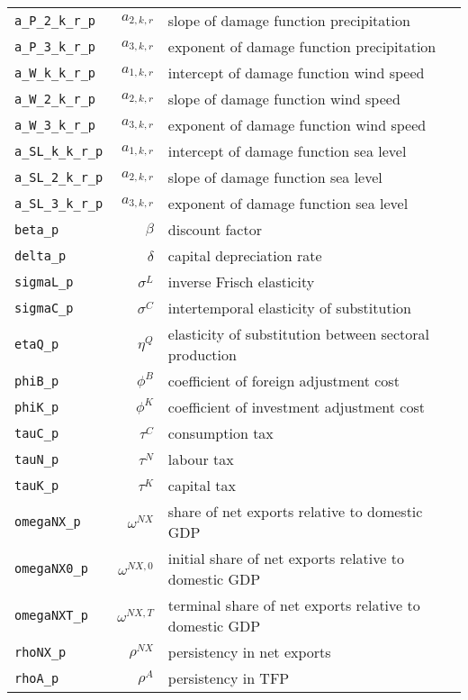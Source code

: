 \begin{center}
\begin{longtable}{lrl}
\texttt{a\_P\_2\_k\_r\_p} & ${a_{2,k,r}}$ & slope of damage function precipitation\\
\texttt{a\_P\_3\_k\_r\_p} & ${a_{3,k,r}}$ & exponent of damage function precipitation\\
\texttt{a\_W\_k\_k\_r\_p} & ${a_{1,k,r}}$ & intercept of damage function wind speed\\
\texttt{a\_W\_2\_k\_r\_p} & ${a_{2,k,r}}$ & slope of damage function wind speed\\
\texttt{a\_W\_3\_k\_r\_p} & ${a_{3,k,r}}$ & exponent of damage function wind speed\\
\texttt{a\_SL\_k\_k\_r\_p} & ${a_{1,k,r}}$ & intercept of damage function sea level\\
\texttt{a\_SL\_2\_k\_r\_p} & ${a_{2,k,r}}$ & slope of damage function sea level\\
\texttt{a\_SL\_3\_k\_r\_p} & ${a_{3,k,r}}$ & exponent of damage function sea level\\
\texttt{beta\_p} & ${\beta}$ & discount factor\\
\texttt{delta\_p} & ${\delta}$ & capital depreciation rate\\
\texttt{sigmaL\_p} & ${\sigma^{L}}$ & inverse Frisch elasticity\\
\texttt{sigmaC\_p} & ${\sigma^{C}}$ & intertemporal elasticity of substitution\\
\texttt{etaQ\_p} & ${\eta^{Q}}$ & elasticity of substitution between sectoral production\\
\texttt{phiB\_p} & ${\phi^{B}}$ & coefficient of foreign adjustment cost\\
\texttt{phiK\_p} & ${\phi^{K}}$ & coefficient of investment adjustment cost\\
\texttt{tauC\_p} & ${\tau^{C}}$ & consumption tax\\
\texttt{tauN\_p} & ${\tau^{N}}$ & labour tax\\
\texttt{tauK\_p} & ${\tau^{K}}$ & capital tax\\
\texttt{omegaNX\_p} & ${\omega^{NX}}$ & share of net exports relative to domestic GDP\\
\texttt{omegaNX0\_p} & ${\omega^{NX,0}}$ & initial share of net exports relative to domestic GDP\\
\texttt{omegaNXT\_p} & ${\omega^{NX,T}}$ & terminal share of net exports relative to domestic GDP\\
\texttt{rhoNX\_p} & ${\rho^{NX}}$ & persistency in net exports\\
\texttt{rhoA\_p} & ${\rho^{A}}$ & persistency in TFP\\

\end{longtable}
\end{center}
